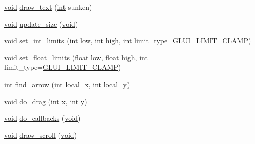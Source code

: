 \begin{DoxyCompactItemize}
\item 
\hyperlink{wglext_8h_a9e6b7f1933461ef318bb000d6bd13b83}{void} \hyperlink{class_g_l_u_i___scrollbar_acefbec38ea1cb5725217fe88382ffc8f}{draw\+\_\+text} (\hyperlink{wglext_8h_a500a82aecba06f4550f6849b8099ca21}{int} sunken)
\item 
\hyperlink{wglext_8h_a9e6b7f1933461ef318bb000d6bd13b83}{void} \hyperlink{class_g_l_u_i___scrollbar_a93ddd03928b9dca260263ee135c0f3a6}{update\+\_\+size} (\hyperlink{wglext_8h_a9e6b7f1933461ef318bb000d6bd13b83}{void})
\item 
\hyperlink{wglext_8h_a9e6b7f1933461ef318bb000d6bd13b83}{void} \hyperlink{class_g_l_u_i___scrollbar_a24df16f55c3810ac5c3e09f1d7d5c70d}{set\+\_\+int\+\_\+limits} (\hyperlink{wglext_8h_a500a82aecba06f4550f6849b8099ca21}{int} low, \hyperlink{wglext_8h_a500a82aecba06f4550f6849b8099ca21}{int} high, \hyperlink{wglext_8h_a500a82aecba06f4550f6849b8099ca21}{int} limit\+\_\+type=\hyperlink{glui_8h_ac968cb6b340a4e1cad7734abc769d934}{G\+L\+U\+I\+\_\+\+L\+I\+M\+I\+T\+\_\+\+C\+L\+A\+M\+P})
\item 
\hyperlink{wglext_8h_a9e6b7f1933461ef318bb000d6bd13b83}{void} \hyperlink{class_g_l_u_i___scrollbar_a41dd618579772fb4b69d87ddd10a601d}{set\+\_\+float\+\_\+limits} (float low, float high, \hyperlink{wglext_8h_a500a82aecba06f4550f6849b8099ca21}{int} limit\+\_\+type=\hyperlink{glui_8h_ac968cb6b340a4e1cad7734abc769d934}{G\+L\+U\+I\+\_\+\+L\+I\+M\+I\+T\+\_\+\+C\+L\+A\+M\+P})
\item 
\hyperlink{wglext_8h_a500a82aecba06f4550f6849b8099ca21}{int} \hyperlink{class_g_l_u_i___scrollbar_ab81345b11efd1e3901443d68451d5a9f}{find\+\_\+arrow} (\hyperlink{wglext_8h_a500a82aecba06f4550f6849b8099ca21}{int} local\+\_\+x, \hyperlink{wglext_8h_a500a82aecba06f4550f6849b8099ca21}{int} local\+\_\+y)
\item 
\hyperlink{wglext_8h_a9e6b7f1933461ef318bb000d6bd13b83}{void} \hyperlink{class_g_l_u_i___scrollbar_abc9e5c7daaf6bac77eb8af728d46ddd8}{do\+\_\+drag} (\hyperlink{wglext_8h_a500a82aecba06f4550f6849b8099ca21}{int} \hyperlink{glext_8h_ad77deca22f617d3f0e0eb786445689fc}{x}, \hyperlink{wglext_8h_a500a82aecba06f4550f6849b8099ca21}{int} \hyperlink{glext_8h_a9298c7ad619074f5285b32c6b72bfdea}{y})
\item 
\hyperlink{wglext_8h_a9e6b7f1933461ef318bb000d6bd13b83}{void} \hyperlink{class_g_l_u_i___scrollbar_aec86dd3e95390d09b427670227d091e9}{do\+\_\+callbacks} (\hyperlink{wglext_8h_a9e6b7f1933461ef318bb000d6bd13b83}{void})
\item 
\hyperlink{wglext_8h_a9e6b7f1933461ef318bb000d6bd13b83}{void} \hyperlink{class_g_l_u_i___scrollbar_ae9bede2305c61af3abb50ab05e91be72}{draw\+\_\+scroll} (\hyperlink{wglext_8h_a9e6b7f1933461ef318bb000d6bd13b83}{void})

\end{DoxyCompactItemize}
